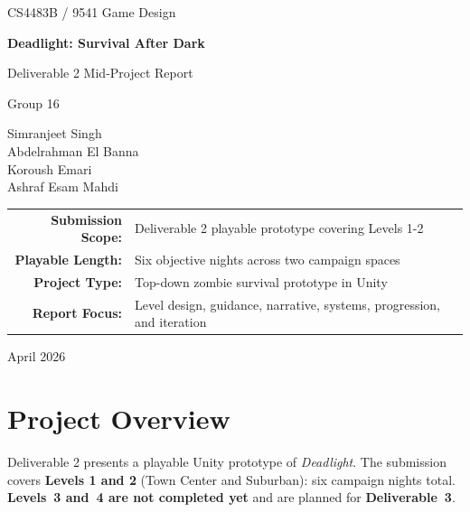 \documentclass[11pt]{article}
\begin{document}
\hypersetup{pageanchor=false}

\begin{titlepage}
    \centering
    \vspace*{1.2cm}

    {\Large CS4483B / 9541 Game Design \par}
    \vspace{0.6cm}
    {\Huge \bfseries Deadlight: Survival After Dark \par}
    \vspace{0.35cm}
    {\LARGE Deliverable 2 Mid-Project Report \par}
    \vspace{0.8cm}

    {\large Group 16 \par}
    \vspace{0.2cm}
    {\normalsize
    Simranjeet Singh \\
    Abdelrahman El Banna \\
    Koroush Emari \\
    Ashraf Esam Mahdi \par}

    \vspace{1.0cm}

    \begin{tabular}{rl}
        \textbf{Submission Scope:} & Deliverable 2 playable prototype covering Levels 1-2 \\
        \textbf{Playable Length:} & Six objective nights across two campaign spaces \\
        \textbf{Project Type:} & Top-down zombie survival prototype in Unity \\
        \textbf{Report Focus:} & Level design, guidance, narrative, systems, progression, and iteration
    \end{tabular}

    \vfill

    {\large April 2026\par}
\end{titlepage}
\clearpage
\tableofcontents
\clearpage
\hypersetup{pageanchor=true}
\setcounter{page}{1}

\section{Project Overview}

Deliverable 2 presents a playable Unity prototype of \textit{Deadlight}. The submission covers \textbf{Levels 1 and 2} (Town Center and Suburban): six campaign nights total. \textbf{Levels~3 and~4 are not completed yet} and are planned for \textbf{Deliverable~3}.
\end{document}
